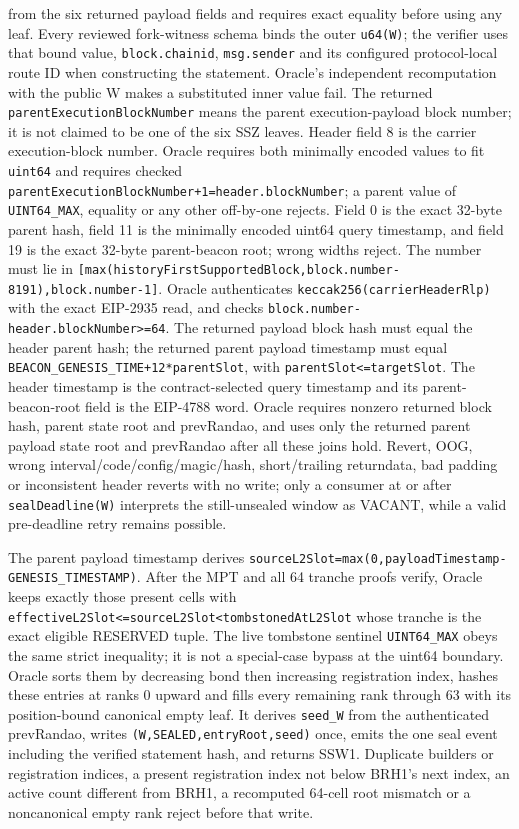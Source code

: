\documentclass[a4paper,11pt]{article}
\newcommand{\code}[1]{\nolinkurl{#1}}
\begin{document}
from the six returned payload fields and requires exact equality before using
any leaf.  Every reviewed fork-witness schema binds the outer \code{u64(W)};
the verifier uses that bound value, \code{block.chainid}, \code{msg.sender}
and its configured protocol-local route ID when constructing the statement.  Oracle's
independent recomputation with the public W makes a substituted inner value
fail.  The returned \code{parentExecutionBlockNumber} means the parent
execution-payload block number; it is not claimed to be one of the six SSZ
leaves.  Header field 8 is the carrier execution-block number.  Oracle requires
both minimally encoded values to fit \code{uint64} and requires checked
\code{parentExecutionBlockNumber+1=header.blockNumber}; a parent value of
\code{UINT64_MAX}, equality or any other off-by-one rejects.  Field 0 is the exact
32-byte parent hash, field 11 is the minimally encoded uint64 query timestamp,
and field 19 is the exact 32-byte parent-beacon root; wrong widths reject.
The number must lie in
\code{[max(historyFirstSupportedBlock,block.number-8191),block.number-1]}.
Oracle authenticates
\code{keccak256(carrierHeaderRlp)} with the exact EIP-2935 read, and checks
\code{block.number-header.blockNumber>=64}.  The returned payload block hash
must equal the header parent hash; the returned parent payload timestamp must
equal \code{BEACON_GENESIS_TIME+12*parentSlot}, with
\code{parentSlot<=targetSlot}.  The header timestamp is the contract-selected
query timestamp and its parent-beacon-root field is the EIP-4788 word.  Oracle
requires nonzero returned block hash, parent state root and prevRandao, and
uses only the returned parent payload state root and prevRandao after all these
joins hold.  Revert,
OOG, wrong interval/code/config/magic/hash, short/trailing returndata, bad
padding or inconsistent header reverts with no write; only a
consumer at or after \code{sealDeadline(W)} interprets the still-unsealed
window as VACANT, while a valid pre-deadline retry remains possible.

The parent payload timestamp derives
\code{sourceL2Slot=max(0,payloadTimestamp-GENESIS_TIMESTAMP)}.  After the MPT
and all 64 tranche proofs verify, Oracle keeps exactly those present cells with
\code{effectiveL2Slot<=sourceL2Slot<tombstonedAtL2Slot} whose tranche is the
exact eligible RESERVED tuple.  The live tombstone sentinel
\code{UINT64_MAX} obeys the same strict inequality; it is not a special-case
bypass at the uint64 boundary.  Oracle sorts them by decreasing bond then increasing
registration index, hashes these entries at ranks 0 upward and fills every
remaining rank through 63 with its position-bound canonical empty leaf.  It
derives \code{seed_W} from the authenticated prevRandao, writes
\code{(W,SEALED,entryRoot,seed)} once, emits the one seal event including the
verified statement hash, and returns SSW1.  Duplicate builders or registration
indices, a present registration index not below BRH1's next index, an active
count different from BRH1, a recomputed 64-cell root mismatch
or a noncanonical empty rank reject before that write.
\end{document}
